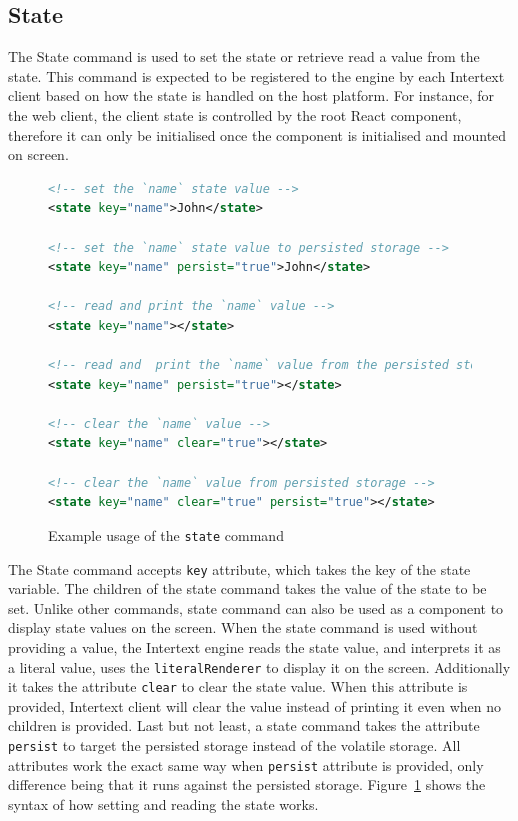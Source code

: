 \subsection{State}

The State command is used to set the state or retrieve read a value from the state. This command is expected to be registered to the engine by each Intertext client based on how the state is handled on the host platform. For instance, for the web client, the client state is controlled by the root React component, therefore it can only be initialised once the component is initialised and mounted on screen. 

\begin{figure}[htb]
\begin{minipage}{\linewidth}
\begin{lstlisting}[language=xml]
<!-- set the `name` state value -->
<state key="name">John</state>

<!-- set the `name` state value to persisted storage -->
<state key="name" persist="true">John</state>

<!-- read and print the `name` value -->
<state key="name"></state>

<!-- read and  print the `name` value from the persisted storage -->
<state key="name" persist="true"></state>

<!-- clear the `name` value -->
<state key="name" clear="true"></state>

<!-- clear the `name` value from persisted storage -->
<state key="name" clear="true" persist="true"></state>
\end{lstlisting}

\end{minipage}
\caption{Example usage of the \texttt{state} command}%
\label{fig:how_state_is_set_and_read}%
\end{figure}

The State command accepts \texttt{key} attribute, which takes the key of the state variable. The children of the state command takes the value of the state to be set. Unlike other commands, state command can also be used as a component to display state values on the screen. When the state command is used without providing a value, the Intertext engine reads the state value, and interprets it as a literal value, uses the \texttt{literalRenderer} to display it on the screen. Additionally it takes the attribute \texttt{clear} to clear the state value. When this attribute is provided, Intertext client will clear the value instead of printing it even when no children is provided. Last but not least, a state command takes the attribute \texttt{persist} to target the persisted storage instead of the volatile storage. All attributes work the exact same way when \texttt{persist} attribute is provided, only difference being that it runs against the persisted storage. Figure~\ref{fig:how_state_is_set_and_read} shows the syntax of how setting and reading the state works.

